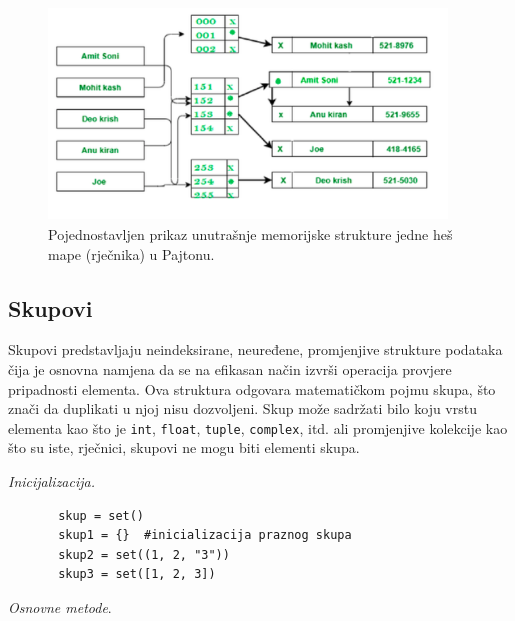 	
	\begin{figure}
		\centering
		\includegraphics[width=300pt,height=160pt]{slike/dict_mem_organization.png}
		\caption{Pojednostavljen prikaz unutrašnje memorijske strukture jedne heš mape (rječnika) u Pajtonu.\protect\footnotemark}		\label{fig: dict_mem_organization}
	\end{figure}
\subsection{Skupovi}

Skupovi  predstavljaju neindeksirane, neuređene, promjenjive strukture podataka čija je osnovna namjena da se na efikasan način izvrši operacija provjere pripadnosti elementa. Ova struktura odgovara matematičkom pojmu skupa, što znači da duplikati u njoj nisu dozvoljeni. Skup može sadržati bilo koju vrstu elementa kao što je \texttt{int}, \texttt{float}, \texttt{tuple}, \texttt{complex}, itd. ali promjenjive kolekcije kao što su iste, rječnici, skupovi ne mogu biti elementi skupa. 


\textit{Inicijalizacija. }
\begin{verbatim}
	   skup = set()
	   skup1 = {}  #inicializacija praznog skupa
	   skup2 = set((1, 2, "3"))
	   skup3 = set([1, 2, 3])
\end{verbatim}

\textit{Osnovne metode}. 

